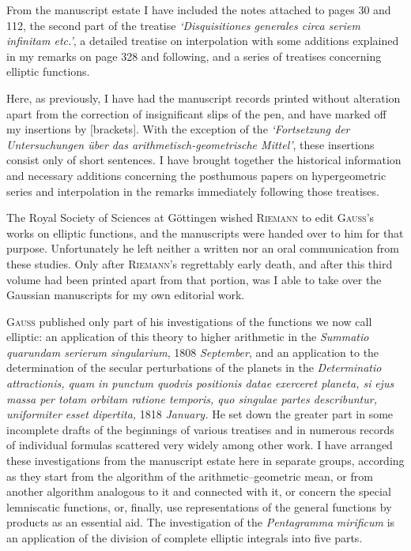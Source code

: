From the manuscript estate I have included the notes attached to pages 30 and 112, the second part of the treatise \textit{‘Disquisitiones generales circa seriem infinitam etc.’}, a detailed treatise on interpolation with some additions explained in my remarks on page 328 and following, and a series of treatises concerning elliptic functions.

Here, as previously, I have had the manuscript records printed without alteration apart from the correction of insignificant slips of the pen, and have marked off my insertions by [brackets]. With the exception of the \textit{‘Fortsetzung der Untersuchungen über das arithmetisch-geometrische Mittel’}, these insertions consist only of short sentences. I have brought together the historical information and necessary additions concerning the posthumous papers on hypergeometric series and interpolation in the remarks immediately following those treatises.

\bigskip
The Royal Society of Sciences at Göttingen wished \textsc{Riemann} to edit \textsc{Gauss}’s works on elliptic functions, and the manuscripts were handed over to him for that purpose. Unfortunately he left neither a written nor an oral communication from these studies. Only after \textsc{Riemann}’s regrettably early death, and after this third volume had been printed apart from that portion, was I able to take over the Gaussian manuscripts for my own editorial work.

\bigskip
\textsc{Gauss} published only part of his investigations of the functions we now call elliptic: an application of this theory to higher arithmetic in the \textit{Summatio quarundam serierum singularium}, 1808 \textit{September}, and an application to the determination of the secular perturbations of the planets in the \textit{Determinatio attractionis, quam in punctum quodvis positionis datae exerceret planeta, si}
\textit{ejus massa per totam orbitam ratione temporis, quo singulae partes describuntur, uniformiter esset dipertita,} 1818 \textit{January.} He set down the greater part in some incomplete drafts of the beginnings of various treatises and in numerous records of individual formulas scattered very widely among other work. I have arranged these investigations from the manuscript estate here in separate groups, according as they start from the algorithm of the arithmetic–geometric mean, or from another algorithm analogous to it and connected with it, or concern the special lemniscatic functions, or, finally, use representations of the general functions by products as an essential aid. The investigation of the \textit{Pentagramma}
\textit{mirificum} is an application of the division of complete elliptic integrals into five parts.

